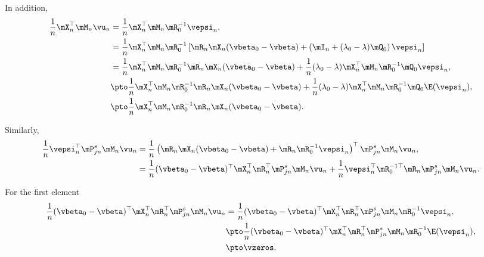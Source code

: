 \documentclass[english,12pt]{book}\usepackage[]{graphicx}\usepackage[]{xcolor}
\begin{document}
\begin{subappendices}
In addition, 
\begin{equation*}
\begin{aligned}
  \frac{1}{n}\mX_n^\top\mM_n\vu_n & = \frac{1}{n}\mX_n^\top\mM_n\mR_0^{-1}\vepsi_n, \\
                                  & = \frac{1}{n}\mX_n^\top\mM_n\mR_0^{-1}\left[\mR_n\mX_n(\vbeta_0 - \vbeta) + \left(\mI_n + (\lambda_0 - \lambda)\mQ_0\right)\vepsi_n\right] \\
                                  & = \frac{1}{n}\mX_n^\top\mM_n\mR_0^{-1}\mR_n\mX_n(\vbeta_0 - \vbeta) + \frac{1}{n}(\lambda_0 - \lambda)\mX_n^\top\mM_n\mR_0^{-1}\mQ_0\vepsi_n, \\
                                  & \pto \frac{1}{n}\mX_n^\top\mM_n\mR_0^{-1}\mR_n\mX_n(\vbeta_0 - \vbeta) + \frac{1}{n}(\lambda_0 - \lambda)\mX_n^\top\mM_n\mR_0^{-1}\mQ_0\E(\vepsi_n), \\
                                  & \pto \frac{1}{n}\mX_n^\top\mM_n\mR_0^{-1}\mR_n\mX_n(\vbeta_0 - \vbeta).
\end{aligned}
\end{equation*}

Similarly, 
\begin{equation}
\begin{aligned}
\frac{1}{n}\vepsi_n^\top \mP_{jn}^s\mM_n\vu_n & = \frac{1}{n}\left(\mR_n\mX_n(\vbeta_0 - \vbeta) + \mR_n\mR_0^{-1}\vepsi_n\right)^\top\mP_{jn}^s\mM_n\vu_n, \\
& = \frac{1}{n}(\vbeta_0 - \vbeta)^\top\mX_n^\top\mR_n^\top \mP_{jn}^s\mM_n\vu_n + \frac{1}{n}\vepsi_n^\top\mR_0^{-1\top}\mR_n\mP_{jn}^s\mM_n\vu_n.
\end{aligned}
\end{equation}

For the first element
\begin{equation*}
\begin{aligned}
  \frac{1}{n}(\vbeta_0 - \vbeta)^\top\mX_n^\top\mR_n^\top \mP_{jn}^s\mM_n\vu_n & = \frac{1}{n}(\vbeta_0 - \vbeta)^\top\mX_n^\top\mR_n^\top \mP_{jn}^s\mM_n\mR_0^{-1}\vepsi_n,\\
  & \pto \frac{1}{n}(\vbeta_0 - \vbeta)^\top\mX_n^\top\mR_n^\top \mP_{jn}^s\mM_n\mR_0^{-1}\E(\vepsi_n), \\
  & \pto \vzeros.
  \end{aligned}
\end{equation*}


\end{subappendices}
\end{document}
